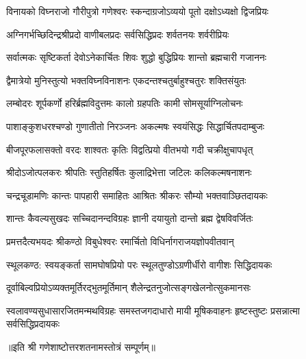 
\twolineshloka
{विनायको विघ्नराजो गौरीपुत्रो गणेश्वरः}
{स्कन्दाग्रजोऽव्ययो पूतो दक्षोऽध्यक्षो द्विजप्रियः}

\twolineshloka
{अग्निगर्भच्छिदिन्द्रश्रीप्रदो वाणीबलप्रदः}
{सर्वसिद्धिप्रदः शर्वतनयः शर्वरीप्रियः}

\twolineshloka
{सर्वात्मकः सृष्टिकर्ता देवोऽनेकार्चितः शिवः}
{शुद्धो बुद्धिप्रियः शान्तो ब्रह्मचारी गजाननः}

\twolineshloka
{द्वैमात्रेयो मुनिस्तुत्यो भक्तविघ्नविनाशनः}
{एकदन्तश्चतुर्बाहुश्चतुरः शक्तिसंयुतः}

\twolineshloka
{लम्बोदरः शूर्पकर्णो हरिर्ब्रह्मविदुत्तमः}
{कालो ग्रहपतिः कामी सोमसूर्याग्निलोचनः}

\twolineshloka
{पाशाङ्कुशधरश्चण्डो गुणातीतो निरञ्जनः}
{अकल्मषः स्वयंसिद्धः सिद्धार्चितपदाम्बुजः}

\twolineshloka
{बीजपूरफलासक्तो वरदः शाश्वतः कृतिः}
{विद्वत्प्रियो वीतभयो गदी चक्रीक्षुचापधृत्}

\twolineshloka
{श्रीदोऽजोत्पलकरः श्रीपतिः स्तुतिहर्षितः}
{कुलाद्रिभेत्ता जटिलः कलिकल्मषनाशनः}

\twolineshloka
{चन्द्रचूडामणिः कान्तः पापहारी समाहितः}
{आश्रितः श्रीकरः सौम्यो भक्तवाञ्छितदायकः}

\twolineshloka
{शान्तः कैवल्यसुखदः सच्चिदानन्दविग्रहः}
{ज्ञानी दयायुतो दान्तो ब्रह्म द्वेषविवर्जितः}

\twolineshloka
{प्रमत्तदैत्यभयदः श्रीकण्ठो विबुधेश्वरः}
{रमार्चितो विधिर्नागराजयज्ञोपवीतवान्}

\twolineshloka
{स्थूलकण्ठ: स्वयङ्कर्ता सामघोषप्रियो परः}
{स्थूलतुण्डोऽग्रणीर्धीरो वागीशः सिद्धिदायकः}

\twolineshloka
{दूर्वाबिल्वप्रियोऽव्यक्तमूर्तिरद्भुतमूर्तिमान्}
{शैलेन्द्रतनुजोत्सङ्गखेलनोत्सुकमानसः}

\threelineshloka
{स्वलावण्यसुधासारजितमन्मथविग्रहः}
{समस्तजगदाधारो मायी मूषिकवाहनः}
{हृष्टस्तुष्टः प्रसन्नात्मा सर्वसिद्धिप्रदायकः}

{॥इति श्री गणेशाष्टोत्तरशतनामस्तोत्रं सम्पूर्णम्॥}
